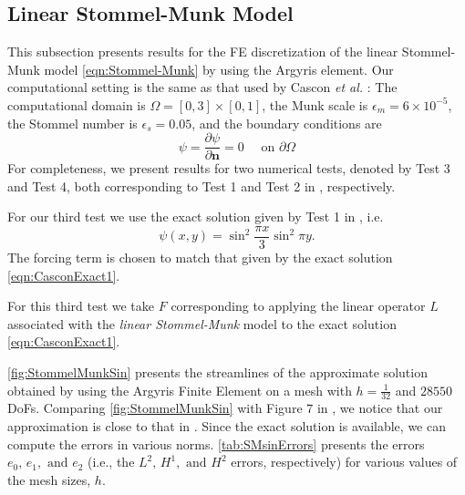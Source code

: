 \subsection{Linear Stommel-Munk Model}\label{sse:SMM}
This subsection presents results for the FE discretization of the linear
Stommel-Munk model \eqref{eqn:Stommel-Munk} by using the Argyris element. Our
computational setting is the same as that used by Cascon \emph{et al.}
\cite{Cascon}: The computational domain is $\Omega = [0,3]\times[0,1]$, the Munk
scale is $\epsilon_m=6\times 10^{-5}$, the Stommel number is $\epsilon_s=0.05$,
and the boundary conditions are
\begin{equation} \label{eqn:SMProb}
  \psi = \frac{\partial \psi}{\partial \mathbf{n}}=0 \quad \text{ on } \partial\Omega
\end{equation}
For completeness, we present results for two numerical tests, denoted by Test 3
and Test 4, both corresponding to Test 1 and Test 2 in \cite{Cascon},
respectively.

For our third test we use the exact solution given by Test 1 in \cite{Cascon},
i.e.
\begin{equation}
  \psi(x,y) = \sin^2 \frac{\pi x}{3} \sin^2 \pi y.
  \label{eqn:CasconExact1}
\end{equation}
The forcing term is chosen to match that given by the exact solution
\eqref{eqn:CasconExact1}.

For this third test we take $F$ corresponding to applying the linear operator
$L$ associated with the \emph{linear Stommel-Munk} model to the exact solution
\eqref{eqn:CasconExact1}.

\autoref{fig:StommelMunkSin} presents the streamlines of the approximate
solution obtained by using the Argyris Finite Element on a mesh with
$h=\frac{1}{32}$ and $28550$ DoFs. Comparing \autoref{fig:StommelMunkSin} with
Figure $7$ in \cite{Cascon}, we notice that our approximation is close to that in
\cite{Myers}. Since the exact solution is available, we can compute the errors
in various norms. \autoref{tab:SMsinErrors} presents the errors $e_0,\, e_1,
\text{ and } e_2$ (i.e., the $L^2,\, H^1, \text{ and } H^2$ errors,
respectively) for various values of the mesh sizes, $h$.

